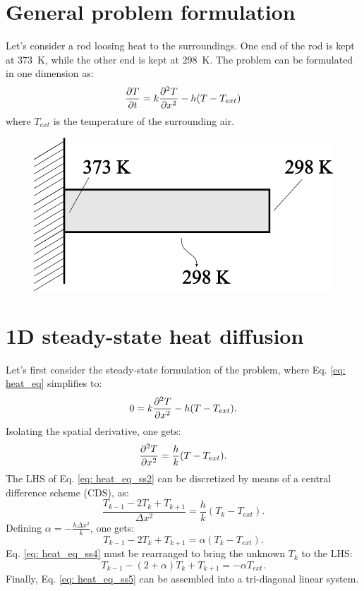\documentclass{article}
\begin{document}
\section*{General problem formulation}


Let's consider a rod loosing heat to the surroundings. One end of the rod is kept at \SI{373}{\kelvin}, while the other end is kept at \SI{298}{\kelvin}. The problem can be formulated in one dimension as:
\begin{equation}\label{eq: heat_eq}
	\pdv{T}{t} = k\pdv[2]{T}{x} - h(T-T_{ext})
\end{equation}
where $ T_{ext} $ is the temperature of the surrounding air.

\begin{figure}[ht!]
	\centering
	\includegraphics[width=0.5\linewidth]{figs/rod}
	\caption{}
	\label{fig:rod}
\end{figure}

\section*{1D steady-state heat diffusion}
Let's first consider the steady-state formulation of the problem, where Eq. \ref{eq: heat_eq} simplifies to:
\begin{equation}\label{eq: heat_eq_ss1}
	0 = k\pdv[2]{T}{x} - h(T-T_{ext}).
\end{equation}
Isolating the spatial derivative, one gets:
\begin{equation}\label{eq: heat_eq_ss2}
	\pdv[2]{T}{x} = \frac{h}{k}(T-T_{ext}).
\end{equation}
The LHS of Eq. \ref{eq: heat_eq_ss2} can be discretized by means of a central difference scheme (CDS), as:
\begin{equation}\label{eq: heat_eq_ss3}
	\frac{T_{k-1}-2T_{k}+T_{k+1}}{\Delta x^2} =  \frac{h}{k}(T_k-T_{ext}).
\end{equation}
Defining $ \alpha =  -\frac{h \Delta x^2}{k} $, one gets:
\begin{equation}\label{eq: heat_eq_ss4}
	T_{k-1}-2T_{k}+T_{k+1} = \alpha (T_k-T_{ext}).
\end{equation}
Eq. \ref{eq: heat_eq_ss4} must be rearranged to bring the unknown $ T_k $ to the LHS:
\begin{equation}\label{eq: heat_eq_ss5}
	T_{k-1}-(2+\alpha)T_{k}+T_{k+1} = -\alpha T_{ext}.
\end{equation}
Finally, Eq. \ref{eq: heat_eq_ss5} can be assembled into a tri-diagonal linear system.
\end{document}
